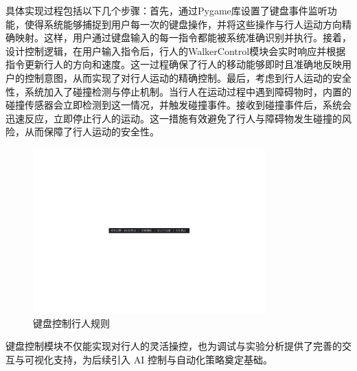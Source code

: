 具体实现过程包括以下几个步骤：首先，通过Pygame库设置了键盘事件监听功能，使得系统能够捕捉到用户每一次的键盘操作，并将这些操作与行人运动方向精确映射。这样，用户通过键盘输入的每一指令都能被系统准确识别并执行。接着，设计控制逻辑，在用户输入指令后，行人的WalkerControl模块会实时响应并根据指令更新行人的方向和速度。这一过程确保了行人的移动能够即时且准确地反映用户的控制意图，从而实现了对行人运动的精确控制。最后，考虑到行人运动的安全性，系统加入了碰撞检测与停止机制。当行人在运动过程中遇到障碍物时，内置的碰撞传感器会立即检测到这一情况，并触发碰撞事件。接收到碰撞事件后，系统会迅速反应，立即停止行人的运动。这一措施有效避免了行人与障碍物发生碰撞的风险，从而保障了行人运动的安全性。

\begin{figure}[H]
    \centering
    \includegraphics[width=0.8\textwidth]{images/keyboard_control.pdf}
    \caption{键盘控制行人规则}
    \label{f.keyboard_control}
\end{figure}

键盘控制模块不仅能实现对行人的灵活操控，也为调试与实验分析提供了完善的交互与可视化支持，为后续引入 AI 控制与自动化策略奠定基础。
